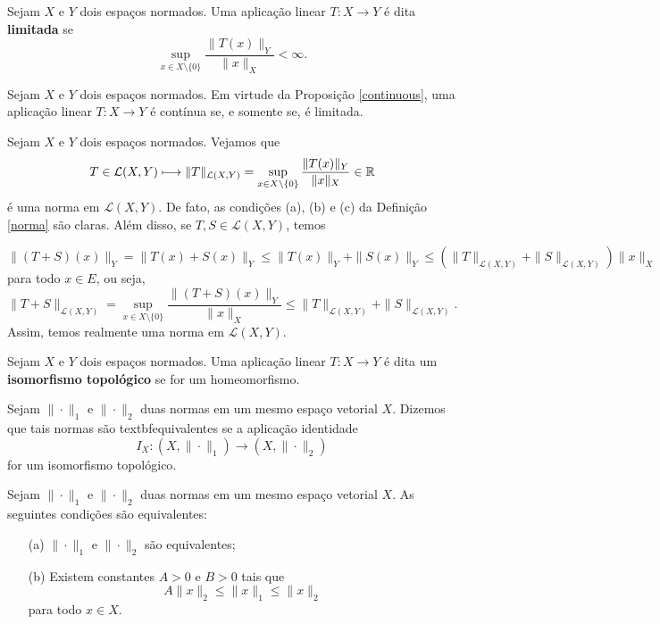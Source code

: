 \begin{definition}
Sejam $X$ e $Y$ dois espaços normados. Uma aplicação linear $T:X \longrightarrow Y$ é dita \textbf{limitada} se 
\[
\displaystyle \sup_{x\in X\setminus \{0\}} \frac{\|T(x)\|_Y}{\|x\|_X} <\infty.
\]
\end{definition}

\begin{remark}
Sejam $X$ e $Y$ dois espaços normados. Em virtude da Proposição \ref{continuous}, uma aplicação linear $T:X\longrightarrow Y$ é contínua se, e somente se, é limitada. 
\end{remark}

\begin{example}
Sejam $X$ e $Y$ dois espaços normados. Vejamos que 
\[
T\in \mathcal L (X,Y) \longmapsto \|T\|_{\mathcal L (X,Y)} = \sup_{x\in X\setminus \{0\}} \frac{\|T(x)\|_Y}{\|x\|_X} \in \mathbb{R}
\]
é uma norma em $\mathcal L (X,Y)$. De fato, as condições (a), (b) e (c) da Definição \ref{norma} são claras. Além disso, se $T,S\in \mathcal L (X,Y)$, temos

\begin{equation*}
\displaystyle \|(T+S)(x)\|_Y=\|T(x)+S(x)\|_Y \leq \|T(x)\|_Y +\|S(x)\|_Y \leq (\|T\|_{\mathcal L (X,Y)} + \|S\|_{\mathcal L (X,Y)})\|x\|_X
\end{equation*}
para todo $x\in E$, ou seja,
\begin{equation*}
    \displaystyle \|T+S\|_{\mathcal L (X,Y)}=\sup_{x\in X\setminus \{0\}} \frac{\|(T+S)(x)\|_Y}{\|x\|_X} \leq \|T\|_{\mathcal L (X,Y)}+\|S\|_{\mathcal L (X,Y)}.
\end{equation*}
Assim, temos realmente uma norma em $\mathcal L (X,Y)$.
\end{example}

\begin{definition}
Sejam $X$ e $Y$ dois espaços normados. Uma aplicação linear $T:X\longrightarrow Y$ é dita um \textbf{isomorfismo topológico} se for um homeomorfismo. 
\end{definition}

\begin{definition}
Sejam $\|\cdot\|_1$ e $\|\cdot\|_2$ duas normas em um mesmo espaço vetorial $X$. Dizemos que tais normas são textbf{equivalentes} se a aplicação identidade
\[
\displaystyle I_X : (X,\|\cdot\|_1) \longrightarrow (X,\|\cdot\|_2)
\]
for um isomorfismo topológico.
\end{definition}

\begin{corollary}
Sejam $\|\cdot\|_1$ e $\|\cdot\|_2$ duas normas em um mesmo espaço vetorial $X$. As seguintes condições são equivalentes:
\begin{itemize}
\item[(a)] $\|\cdot\|_1$ e $\|\cdot\|_2$ são equivalentes;
\item[(b)] Existem constantes $A>0$ e $B>0$ tais que
\[
A\|x\|_2 \leq \|x\|_1 \leq \|x\|_2
\]
para todo $x\in X$.
\end{itemize}
\end{corollary}

